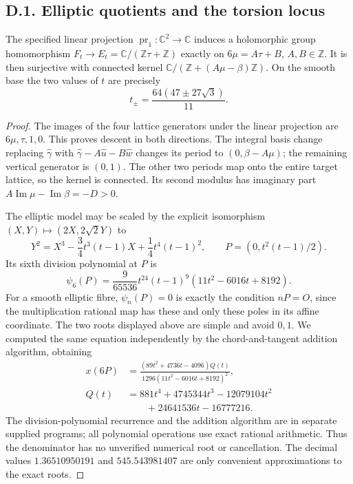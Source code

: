 \subsection{D.1. Elliptic quotients and the torsion locus}
\begin{proposition}[D.1.1; Proved]\label{st:D.1.1}
The specified linear projection \(\operatorname{pr}_1:\mathbb C^2\to
\mathbb C\) induces a holomorphic group homomorphism
\(F_t\to E_t=\mathbb C/(\mathbb Z\tau+\mathbb Z)\) exactly on
\(6\mu=A\tau+B\), \(A,B\in\mathbb Z\). It is then surjective with
connected kernel
\(\mathbb C/(\mathbb Z+(A\mu-\beta)\mathbb Z)\).
On the smooth base the two values of \(t\) are precisely
\[
 t_\pm=\frac{64(47\pm27\sqrt3)}{11}.
\]
\end{proposition}
\begin{proof}
The images of the four lattice generators under the linear projection
are \(6\mu,\tau,1,0\). This proves descent in both directions.
The integral basis change replacing \(\widehat\gamma\) with
\(\widehat\gamma-A\widehat u-B\widehat w\) changes its period to
\((0,\beta-A\mu)\); the remaining vertical generator is \((0,1)\).
The other two periods map onto the entire target lattice, so the kernel
is connected. Its second modulus has imaginary part
\(A\operatorname{Im}\mu-\operatorname{Im}\beta=-D>0\).

The elliptic model may be scaled by the explicit isomorphism
\((X,Y)\mapsto(2X,2\sqrt2Y)\) to
\[
 Y^2=X^3-\frac34t^3(t-1)X+\frac14t^4(t-1)^2,
 \qquad P=(0,t^2(t-1)/2).
\]
Its sixth division polynomial at \(P\) is
\[
 \psi_6(P)=\frac9{65536}t^{24}(t-1)^9
 (11t^2-6016t+8192).
\]
For a smooth elliptic fibre, \(\psi_n(P)=0\) is exactly the condition
\(nP=O\), since the multiplication rational map has these and only these
poles in its affine coordinate. The two roots displayed above are simple
and avoid \(0,1\). We computed the same equation independently by the
chord-and-tangent addition algorithm, obtaining
\[
 \begin{aligned}
 x(6P)&=\frac{(89t^2+4736t-4096)Q(t)}
 {1296(11t^2-6016t+8192)^2},\\
 Q(t)&=881t^4+4745344t^3-12079104t^2\\
 &\hspace{2em}+24641536t-16777216.
 \end{aligned}
\]
The division-polynomial recurrence and the addition algorithm are in
separate supplied programs; all polynomial operations use exact rational
arithmetic. Thus the denominator has no unverified numerical root or
cancellation. The decimal values \(1.36510950191\) and
\(545.543981407\) are only convenient approximations to the exact roots.
\end{proof}

